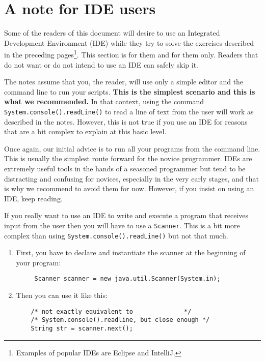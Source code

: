 
\section{A note for IDE users}
\label{sec:note-ide-users}

Some of the readers of this document will desire to use an Integrated
Development Environment (IDE) while they try to solve the exercises
described in the preceding 
pages\footnote{Examples of popular IDEs are Eclipse and IntelliJ. }. 
This section is for them and for
them only. Readers that do not want or do not intend to use an IDE can
safely skip it. 

The notes assume that you, the reader, will use 
only a simple editor and the command line to run your scripts. 
\textbf{This is the simplest scenario
and this is what we recommended.} 
In that context, using the command
\verb+System.console().readLine()+ to read a line of text from the
user will work as described in the notes. However, this is not true if
you use an IDE for reasons that are a bit complex to explain at this
basic level.

Once again, our initial advice is to run all your programs from the
command line. This is usually the simplest route forward for the
novice programmer. IDEs are extremely useful tools in the hands of a
seasoned programmer but tend to be distracting and confusing for
novices, especially in the very early stages, and that is why we
recommend to avoid them for now. However, if you insist on using an
IDE, keep reading. 

If you really want to use an IDE to write and execute a program that
receives input from the user then you will have to use a
\verb+Scanner+. This is a bit more complex than using
\verb+System.console().readLine()+ but not that much.

\begin{enumerate}
\item First, you have to declare and instantiate the scanner at the
beginning of your program:

\begin{verbatim}
     Scanner scanner = new java.util.Scanner(System.in);
\end{verbatim}

\item Then you can use it like this:

\begin{verbatim}
    /* not exactly equivalent to              */
    /* System.console().readline, but close enough */
    String str = scanner.next();
\end{verbatim}

\end{enumerate}


